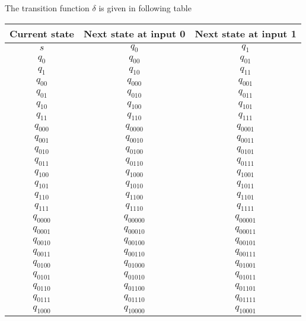 \documentclass{article}
\begin{document}
    The transition function $\delta$ is given in following table\\
    \begin{longtable}{|c|c|c|}
      \hline
       \textbf{Current state} & \textbf{Next state at input 0} & \textbf{Next state at input 1} \\ \hline
      $s$ & $q_{0}$ & $q_{1}$ \\ \hline
      $q_{0}$ & $q_{00}$ & $q_{01}$ \\ \hline
      $q_{1}$ & $q_{10}$ & $q_{11}$ \\ \hline
      $q_{00}$ & $q_{000}$ & $q_{001}$ \\ \hline
      $q_{01}$ & $q_{010}$ & $q_{011}$ \\ \hline
      $q_{10}$ & $q_{100}$ & $q_{101}$ \\ \hline
      $q_{11}$ & $q_{110}$ & $q_{111}$ \\ \hline
      $q_{000}$ & $q_{0000}$ & $q_{0001}$ \\ \hline
      $q_{001}$ & $q_{0010}$ & $q_{0011}$ \\ \hline
      $q_{010}$ & $q_{0100}$ & $q_{0101}$ \\ \hline
      $q_{011}$ & $q_{0110}$ & $q_{0111}$ \\ \hline
      $q_{100}$ & $q_{1000}$ & $q_{1001}$ \\ \hline
      $q_{101}$ & $q_{1010}$ & $q_{1011}$ \\ \hline
      $q_{110}$ & $q_{1100}$ & $q_{1101}$ \\ \hline
      $q_{111}$ & $q_{1110}$ & $q_{1111}$ \\ \hline
      $q_{0000}$ & $q_{00000}$ & $q_{00001}$ \\ \hline
      $q_{0001}$ & $q_{00010}$ & $q_{00011}$ \\ \hline
      $q_{0010}$ & $q_{00100}$ & $q_{00101}$ \\ \hline
      $q_{0011}$ & $q_{00110}$ & $q_{00111}$ \\ \hline
      $q_{0100}$ & $q_{01000}$ & $q_{01001}$ \\ \hline
      $q_{0101}$ & $q_{01010}$ & $q_{01011}$ \\ \hline
      $q_{0110}$ & $q_{01100}$ & $q_{01101}$ \\ \hline
      $q_{0111}$ & $q_{01110}$ & $q_{01111}$ \\ \hline
      $q_{1000}$ & $q_{10000}$ & $q_{10001}$ \\ \hline

\end{longtable}
\end{document}

